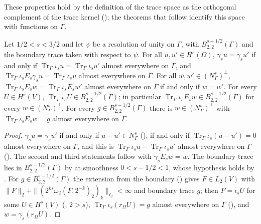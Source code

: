 These properties hold by the definition of the trace space as the orthogonal complement of the
trace kernel (); the theorems that follow identify this space with
functions on $\Gamma$.

\begin{theorem}
\label{thm:trace-space-functions}
\leanok
{}
Let $1/2 < s < 3/2$ and let $\psi$ be a resolution of unity on $\Gamma$, with
$B^{s-1/2}_{2,2}(\Gamma)$ and the boundary trace taken with respect to $\psi$. For all
$u, u' \in H^s(\Omega)$, $\gamma_s u = \gamma_s u'$ if and only if
$\operatorname{Tr}_\Gamma \iota_s u = \operatorname{Tr}_\Gamma \iota_s u'$ almost everywhere on
$\Gamma$, and
$\operatorname{Tr}_\Gamma \iota_s E_s \gamma_s u = \operatorname{Tr}_\Gamma \iota_s u$ almost
everywhere on $\Gamma$. For all $w, w' \in (N^s_\Gamma)^\perp$,
$\operatorname{Tr}_\Gamma \iota_s E_s w = \operatorname{Tr}_\Gamma \iota_s E_s w'$ almost
everywhere on $\Gamma$ if and only if $w = w'$. For every $U \in H^s(V)$,
$\operatorname{Tr}_\Gamma \iota_s U \in B^{s-1/2}_{2,2}(\Gamma)$; in particular
$\operatorname{Tr}_\Gamma \iota_s E_s w \in B^{s-1/2}_{2,2}(\Gamma)$ for every
$w \in (N^s_\Gamma)^\perp$. For every $g \in B^{s-1/2}_{2,2}(\Gamma)$ there is
$w \in (N^s_\Gamma)^\perp$ with $\operatorname{Tr}_\Gamma \iota_s E_s w = g$ almost everywhere on
$\Gamma$.
\end{theorem}

\begin{proof}
\leanok
$\gamma_s u = \gamma_s u'$ if and only if $u - u' \in N^s_\Gamma$
(), if and only if
$\operatorname{Tr}_\Gamma \iota_s (u - u') = 0$ almost everywhere on $\Gamma$, and this is
$\operatorname{Tr}_\Gamma \iota_s u - \operatorname{Tr}_\Gamma \iota_s u'$ almost everywhere on
$\Gamma$ (). The second and third statements follow with
$\gamma_s E_s w = w$. The boundary trace lies in $B^{s-1/2}_{2,2}(\Gamma)$ by
 at smoothness $0 < s - 1/2 < 1$, whose hypothesis holds by
. For $g \in B^{s-1/2}_{2,2}(\Gamma)$ the extension from the
boundary () gives $F \in L_2(V)$ with
$\|F\|_2 + \|(2^{ks} \omega_2(F, 2^{-k})_2)_k\|_{\ell_2} < \infty$ and boundary trace $g$; then
$F = \iota_s U$ for some $U \in H^s(V)$ (, $2 > s$),
$\operatorname{Tr}_\Gamma \iota_s(r_\Omega U) = g$ almost everywhere on $\Gamma$
(), and $w = \gamma_s(r_\Omega U)$.
\end{proof}

